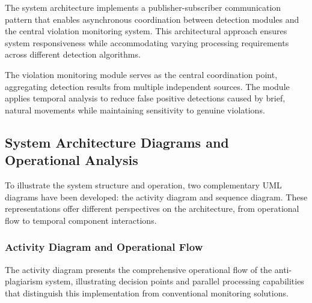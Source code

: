 \documentclass[conference]{IEEEtran}
\begin{document}
The system architecture implements a publisher-subscriber communication pattern that enables 
asynchronous coordination between detection modules and the central violation monitoring 
system. This architectural approach ensures system responsiveness while accommodating 
varying processing requirements across different detection algorithms.

The violation monitoring module serves as the central coordination point, aggregating 
detection results from multiple independent sources. The module applies temporal analysis 
to reduce false positive detections caused by brief, natural movements while maintaining 
sensitivity to genuine violations.

\subsection{System Architecture Diagrams and Operational Analysis}

To illustrate the system structure and operation, two complementary UML diagrams have been developed: the activity diagram and sequence diagram. These representations offer different perspectives on the architecture, from operational flow to temporal component interactions.

\subsubsection{Activity Diagram and Operational Flow}

The activity diagram presents the comprehensive operational flow of the anti-plagiarism system, illustrating decision points and parallel processing capabilities that distinguish this implementation from conventional monitoring solutions.
\end{document}
